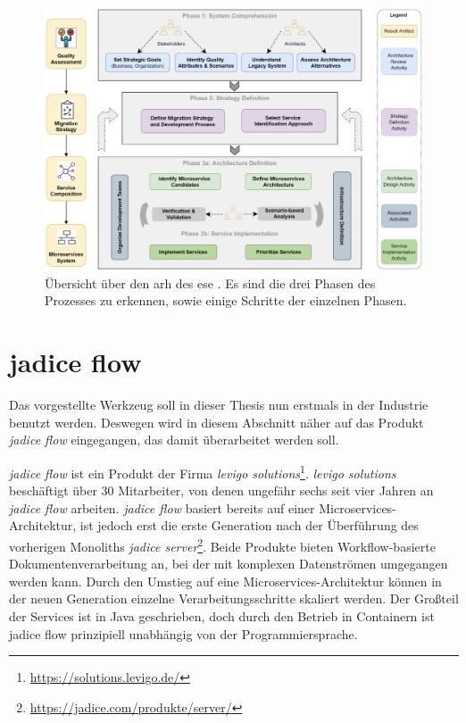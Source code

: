 \begin{figure}
	\centering
	\includegraphics[width=\textwidth]{figures/ese-mmf-overview.png}
	\caption[Architecture Refactoring Helper Übersicht]{
		Übersicht über den \acrlong{arh} des \gls{ese} \cite{fritzsch2022architecturecentric}. Es sind die drei Phasen des Prozesses zu erkennen, sowie einige Schritte der einzelnen Phasen.
	}
	\label{fig:arh-overview}
\end{figure}

\section{jadice flow}

Das vorgestellte Werkzeug soll in dieser Thesis nun erstmals in der Industrie benutzt werden.
Deswegen wird in diesem Abschnitt näher auf das Produkt \emph{jadice flow} eingegangen, das damit überarbeitet werden soll.

\emph{jadice flow} ist ein Produkt der Firma \emph{levigo solutions}\footnote{\url{https://solutions.levigo.de/}}.
\emph{levigo solutions} beschäftigt über 30 Mitarbeiter, von denen ungefähr sechs seit vier Jahren an \emph{jadice flow} arbeiten.
\emph{jadice flow} basiert bereits auf einer Microservices-Architektur, ist jedoch erst die erste Generation nach der Überführung des vorherigen Monoliths \emph{jadice server}\footnote{\url{https://jadice.com/produkte/server/}}.
Beide Produkte bieten Workflow-basierte Dokumentenverarbeitung an, bei der mit komplexen Datenströmen umgegangen werden kann.
Durch den Umstieg auf eine Microservices-Architektur können in der neuen Generation einzelne Verarbeitungsschritte skaliert werden.
Der Großteil der Services ist in Java geschrieben, doch durch den Betrieb in Containern ist jadice flow prinzipiell unabhängig von der Programmiersprache.

